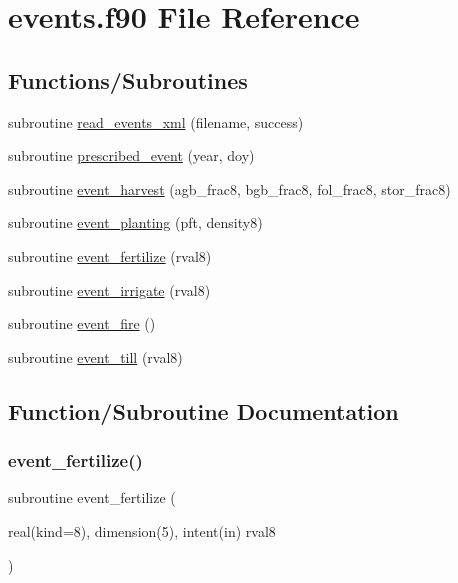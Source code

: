 \hypertarget{events_8f90}{}\section{events.\+f90 File Reference}
\label{events_8f90}
\subsection*{Functions/\+Subroutines}
\begin{DoxyCompactItemize}
\item 
subroutine \hyperlink{events_8f90_a88f99ba09eb95b65d497f6bd8bddaa65}{read\+\_\+events\+\_\+xml} (filename, success)
\item 
subroutine \hyperlink{events_8f90_ad9f17e2da07d80a0734f81d8b2e27d25}{prescribed\+\_\+event} (year, doy)
\item 
subroutine \hyperlink{events_8f90_ad9cbf1522be96cc9af2fbf80b1402d5c}{event\+\_\+harvest} (agb\+\_\+frac8, bgb\+\_\+frac8, fol\+\_\+frac8, stor\+\_\+frac8)
\item 
subroutine \hyperlink{events_8f90_a3fcb64b4de4ae9408c3e365f6cbd1be6}{event\+\_\+planting} (pft, density8)
\item 
subroutine \hyperlink{events_8f90_a322bdb70cc0c534c9e30db1a3a4b58a0}{event\+\_\+fertilize} (rval8)
\item 
subroutine \hyperlink{events_8f90_a197a13ef9490ada81059c66e30c88b66}{event\+\_\+irrigate} (rval8)
\item 
subroutine \hyperlink{events_8f90_af7863095b0112267385c3f252218c678}{event\+\_\+fire} ()
\item 
subroutine \hyperlink{events_8f90_a344468d6236c4635f3bd01bc47acde4a}{event\+\_\+till} (rval8)
\end{DoxyCompactItemize}


\subsection{Function/\+Subroutine Documentation}
\mbox{\label{events_8f90_a322bdb70cc0c534c9e30db1a3a4b58a0}} 
\subsubsection{\texorpdfstring{event\+\_\+fertilize()}{event\_fertilize()}}
{\footnotesize\ttfamily subroutine event\+\_\+fertilize (\begin{DoxyParamCaption}\item[{real(kind=8), dimension(5), intent(in)}]{rval8 }\end{DoxyParamCaption})}


